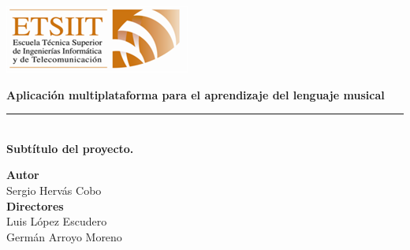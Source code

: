 \begin{titlepage}
 
 
\setlength{\centeroffset}{-0.5\oddsidemargin}
\addtolength{\centeroffset}{0.5\evensidemargin}

\noindent\hspace*{\centeroffset}\begin{minipage}{\textwidth}

\centering

% 


\includegraphics{imagenes/etsiit_logo.png} 
 \vspace{0.5cm}


{\Huge\bfseries Aplicación multiplataforma para el aprendizaje del lenguaje musical\\
}
\noindent\rule[-1ex]{\textwidth}{3pt}\\[3.5ex]
{\large\bfseries Subtítulo del proyecto.\\[4cm]}
\end{minipage}

\vspace{2.5cm}
\noindent\hspace*{\centeroffset}\begin{minipage}{\textwidth}
\centering

\textbf{Autor}\\ {Sergio Hervás Cobo}\\[2.5ex]
\textbf{Directores}\\
{Luis López Escudero\\
Germán Arroyo Moreno}\\[2cm]
\end{minipage}

 
\end{titlepage}


